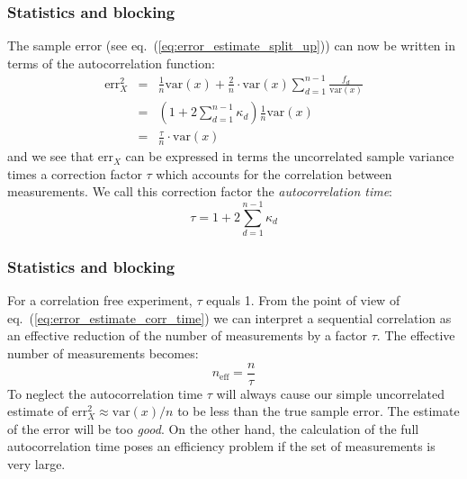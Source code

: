 \documentclass{beamer}
\begin{document}
\begin{frame}
\frametitle{Statistics and blocking}

\begin{block}{}
The sample error (see eq.~(\ref{eq:error_estimate_split_up})) can now be
written in terms of the autocorrelation function:
\begin{eqnarray}
\mathrm{err}_X^2 &=&
\frac{1}{n}\mathrm{var}(x)+\frac{2}{n}\cdot\mathrm{var}(x)\sum_{d=1}^{n-1}
\frac{f_d}{\mathrm{var}(x)}\nonumber\\ &=&
\left(1+2\sum_{d=1}^{n-1}\kappa_d\right)\frac{1}{n}\mathrm{var}(x)\nonumber\\
&=&\frac{\tau}{n}\cdot\mathrm{var}(x)
\label{eq:error_estimate_corr_time}
\end{eqnarray}
and we see that $\mathrm{err}_X$ can be expressed in terms the
uncorrelated sample variance times a correction factor $\tau$ which
accounts for the correlation between measurements. We call this
correction factor the \emph{autocorrelation time}:
\begin{equation}
\tau = 1+2\sum_{d=1}^{n-1}\kappa_d
\label{eq:autocorrelation_time}
\end{equation}
\end{block}
\end{frame}

\begin{frame}
\frametitle{Statistics and blocking}

\begin{block}{}
For a correlation free experiment, $\tau$
equals 1. From the point of view of
eq.~(\ref{eq:error_estimate_corr_time}) we can interpret a sequential
correlation as an effective reduction of the number of measurements by
a factor $\tau$. The effective number of measurements becomes:
\[
n_\mathrm{eff} = \frac{n}{\tau}
\]
To neglect the autocorrelation time $\tau$ will always cause our
simple uncorrelated estimate of $\mathrm{err}_X^2\approx \mathrm{var}(x)/n$ to
be less than the true sample error. The estimate of the error will be
too \emph{good}. On the other hand, the calculation of the full
autocorrelation time poses an efficiency problem if the set of
measurements is very large.
\end{block}
\end{frame}
\end{document}
